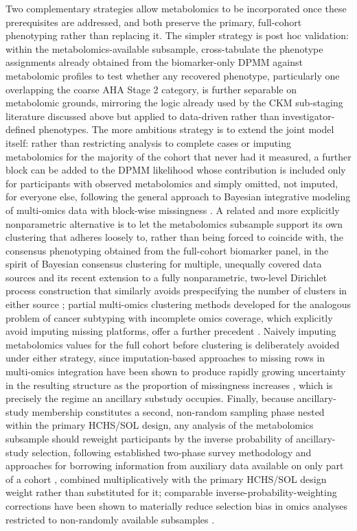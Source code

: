 \documentclass[11pt]{article}
\begin{document}
Two complementary strategies allow metabolomics to be incorporated once these prerequisites are addressed, and both preserve the primary, full-cohort phenotyping rather than replacing it. The simpler strategy is post hoc validation: within the metabolomics-available subsample, cross-tabulate the phenotype assignments already obtained from the biomarker-only DPMM against metabolomic profiles to test whether any recovered phenotype, particularly one overlapping the coarse AHA Stage 2 category, is further separable on metabolomic grounds, mirroring the logic already used by the CKM sub-staging literature discussed above but applied to data-driven rather than investigator-defined phenotypes. The more ambitious strategy is to extend the joint model itself: rather than restricting analysis to complete cases or imputing metabolomics for the majority of the cohort that never had it measured, a further block can be added to the DPMM likelihood whose contribution is included only for participants with observed metabolomics and simply omitted, not imputed, for everyone else, following the general approach to Bayesian integrative modeling of multi-omics data with block-wise missingness \citep{fang2018bayesian,lin2020general}. A related and more explicitly nonparametric alternative is to let the metabolomics subsample support its own clustering that adheres loosely to, rather than being forced to coincide with, the consensus phenotyping obtained from the full-cohort biomarker panel, in the spirit of Bayesian consensus clustering for multiple, unequally covered data sources \citep{lock2013bayesian} and its recent extension to a fully nonparametric, two-level Dirichlet process construction that similarly avoids prespecifying the number of clusters in either source \citep{burhanuddin2026integrative}; partial multi-omics clustering methods developed for the analogous problem of cancer subtyping with incomplete omics coverage, which explicitly avoid imputing missing platforms, offer a further precedent \citep{rappoport2018nemo}. Naively imputing metabolomics values for the full cohort before clustering is deliberately avoided under either strategy, since imputation-based approaches to missing rows in multi-omics integration have been shown to produce rapidly growing uncertainty in the resulting structure as the proportion of missingness increases \citep{voillet2016handling}, which is precisely the regime an ancillary substudy occupies. Finally, because ancillary-study membership constitutes a second, non-random sampling phase nested within the primary HCHS/SOL design, any analysis of the metabolomics subsample should reweight participants by the inverse probability of ancillary-study selection, following established two-phase survey methodology \citep{breslow2009improved} and approaches for borrowing information from auxiliary data available on only part of a cohort \citep{chen2021improving}, combined multiplicatively with the primary HCHS/SOL design weight rather than substituted for it; comparable inverse-probability-weighting corrections have been shown to materially reduce selection bias in omics analyses restricted to non-randomly available subsamples \citep{carry2021inverse}.
\end{document}
